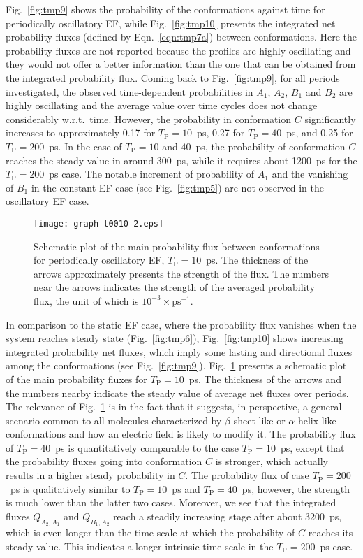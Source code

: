 \documentclass[a4paper,preprint,unsortedaddress,onecolumn]{revtex4-1}
\newcommand{\period}[0]{T_{\textrm{P}}}
\begin{document}
Fig.~\ref{fig:tmp9} shows the probability of the
conformations against time for periodically oscillatory EF,
while  
Fig.~\ref{fig:tmp10} presents the integrated net probability fluxes
(defined by Eqn.~\eqref{eqn:tmp7a}) between
conformations. Here the probability fluxes are not reported
because the profiles are highly oscillating and they would not offer 
a better information than the one that can be obtained from the integrated probability flux.
Coming back to Fig.~\ref{fig:tmp9}, for all periods investigated,
the observed time-dependent probabilities  in $A_1$, $A_2$, $B_1$ and $B_2$ are
highly oscillating and the average value over time cycles does not change
considerably w.r.t.~time.
However, the probability in conformation $C$ significantly
increases to approximately 0.17 for $\period =10$~ps, 0.27 for  $\period =40$~ps, and
0.25 for $\period =200$~ps.
In the case of $\period =10$ and $40$~ps, {the probability of conformation $C$}
reaches the steady value in around 300~ps, while it requires about 1200~ps
for the $\period =200$~ps case. 
The notable increment of probability of $A_1$ and
  the vanishing of $B_1$ in the constant EF case (see Fig.~\ref{fig:tmp5})
are not observed in the oscillatory EF case.
\begin{figure}
  \centering
  \texttt{[image: graph-t0010-2.eps]}
  \caption{Schematic plot of the main probability flux between conformations
    for periodically oscillatory EF, $\period =10$~ps. The thickness 
    of the arrows approximately presents the strength of the flux.
    The numbers near the arrows indicates the strength of the averaged
    probability flux, the unit of which is $10^{-3}\times\textrm{ps}^{-1}$.
  }
  \label{fig:tmp11}
\end{figure}
In comparison to the static EF case, where the probability flux
vanishes when the system reaches steady state (Fig.~\ref{fig:tmp6}), 
Fig.~\ref{fig:tmp10} shows increasing
integrated probability net fluxes, which imply some lasting and directional
fluxes among the conformations (see Fig.~\ref{fig:tmp9}).
Fig.~\ref{fig:tmp11} presents
a schematic plot of the main probability fluxes for $\period =10$~ps.
The thickness of the arrows and the numbers nearby indicate
the steady value of average net fluxes over periods.
{
The relevance of Fig.~\ref{fig:tmp11} is in the fact that it suggests,
in perspective, a general scenario common to all molecules
characterized by $\beta$-sheet-like or $\alpha$-helix-like
conformations and how an electric field is likely to modify it.
}
The probability flux of $\period =40$~ps is quantitatively
comparable to the case $\period =10$~ps, except that the probability fluxes
going into conformation $C$ is stronger, which actually results in
a higher steady probability in $C$.
The probability flux of case $\period =200$~ps is qualitatively
similar to $\period =10$~ps and $\period =40$~ps, however,
the strength is much lower than the latter two cases.
Moreover, 
  we see that the integrated fluxes $Q_{A_2,A_1}$ and $Q_{B_1,A_2}$ reach
  a steadily
increasing stage after about 3200~ps, which is even longer than the time scale
at which the probability of $C$ reaches its steady value. This indicates
a longer intrinsic time scale in the $\period =200$~ps case.
\end{document}
